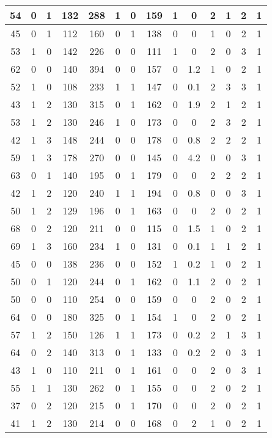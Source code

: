 \documentclass{article}
\begin{document}
\begin{longtable}{|c|c|c|c|c|c|c|c|c|c|c|c|c|c|}
\hline
54 & 0 & 1 & 132 & 288 & 1 & 0 & 159 & 1 & 0 & 2 & 1 & 2 & 1\\
\hline
45 & 0 & 1 & 112 & 160 & 0 & 1 & 138 & 0 & 0 & 1 & 0 & 2 & 1\\
\hline
53 & 1 & 0 & 142 & 226 & 0 & 0 & 111 & 1 & 0 & 2 & 0 & 3 & 1\\
\hline
62 & 0 & 0 & 140 & 394 & 0 & 0 & 157 & 0 & 1.2 & 1 & 0 & 2 & 1\\
\hline
52 & 1 & 0 & 108 & 233 & 1 & 1 & 147 & 0 & 0.1 & 2 & 3 & 3 & 1\\
\hline
43 & 1 & 2 & 130 & 315 & 0 & 1 & 162 & 0 & 1.9 & 2 & 1 & 2 & 1\\
\hline
53 & 1 & 2 & 130 & 246 & 1 & 0 & 173 & 0 & 0 & 2 & 3 & 2 & 1\\
\hline
42 & 1 & 3 & 148 & 244 & 0 & 0 & 178 & 0 & 0.8 & 2 & 2 & 2 & 1\\
\hline
59 & 1 & 3 & 178 & 270 & 0 & 0 & 145 & 0 & 4.2 & 0 & 0 & 3 & 1\\
\hline
63 & 0 & 1 & 140 & 195 & 0 & 1 & 179 & 0 & 0 & 2 & 2 & 2 & 1\\
\hline
42 & 1 & 2 & 120 & 240 & 1 & 1 & 194 & 0 & 0.8 & 0 & 0 & 3 & 1\\
\hline
50 & 1 & 2 & 129 & 196 & 0 & 1 & 163 & 0 & 0 & 2 & 0 & 2 & 1\\
\hline
68 & 0 & 2 & 120 & 211 & 0 & 0 & 115 & 0 & 1.5 & 1 & 0 & 2 & 1\\
\hline
69 & 1 & 3 & 160 & 234 & 1 & 0 & 131 & 0 & 0.1 & 1 & 1 & 2 & 1\\
\hline
45 & 0 & 0 & 138 & 236 & 0 & 0 & 152 & 1 & 0.2 & 1 & 0 & 2 & 1\\
\hline
50 & 0 & 1 & 120 & 244 & 0 & 1 & 162 & 0 & 1.1 & 2 & 0 & 2 & 1\\
\hline
50 & 0 & 0 & 110 & 254 & 0 & 0 & 159 & 0 & 0 & 2 & 0 & 2 & 1\\
\hline
64 & 0 & 0 & 180 & 325 & 0 & 1 & 154 & 1 & 0 & 2 & 0 & 2 & 1\\
\hline
57 & 1 & 2 & 150 & 126 & 1 & 1 & 173 & 0 & 0.2 & 2 & 1 & 3 & 1\\
\hline
64 & 0 & 2 & 140 & 313 & 0 & 1 & 133 & 0 & 0.2 & 2 & 0 & 3 & 1\\
\hline
43 & 1 & 0 & 110 & 211 & 0 & 1 & 161 & 0 & 0 & 2 & 0 & 3 & 1\\
\hline
55 & 1 & 1 & 130 & 262 & 0 & 1 & 155 & 0 & 0 & 2 & 0 & 2 & 1\\
\hline
37 & 0 & 2 & 120 & 215 & 0 & 1 & 170 & 0 & 0 & 2 & 0 & 2 & 1\\
\hline
41 & 1 & 2 & 130 & 214 & 0 & 0 & 168 & 0 & 2 & 1 & 0 & 2 & 1\\

\end{longtable}
\end{document}
